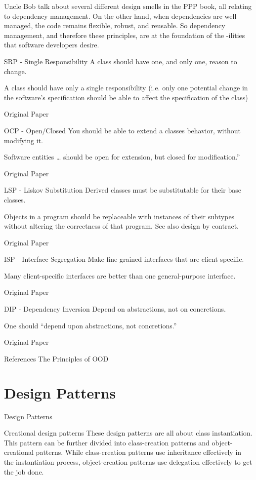 Uncle Bob talk about several different design smells in the PPP book, all relating to dependency management. On the other hand, when dependencies are well managed, the code remains flexible, robust, and reusable. So dependency management, and therefore these principles, are at the foundation of the -ilities that software developers desire.

SRP - Single Responsibility
A class should have one, and only one, reason to change.

A class should have only a single responsibility (i.e. only one potential change in the software's specification should be able to affect the specification of the class)

Original Paper

OCP - Open/Closed
You should be able to extend a classes behavior, without modifying it.

Software entities … should be open for extension, but closed for modification.”

Original Paper

LSP - Liskov Substitution
Derived classes must be substitutable for their base classes.

Objects in a program should be replaceable with instances of their subtypes without altering the correctness of that program. See also design by contract.

Original Paper

ISP - Interface Segregation
Make fine grained interfaces that are client specific.

Many client-specific interfaces are better than one general-purpose interface.

Original Paper

DIP - Dependency Inversion
Depend on abstractions, not on concretions.

One should “depend upon abstractions, not concretions.”

Original Paper

References
The Principles of OOD

\section{Design Patterns}

Design Patterns


Creational design patterns
These design patterns are all about class instantiation. This pattern can be further divided into class-creation patterns and object-creational patterns. While class-creation patterns use inheritance effectively in the instantiation process, object-creation patterns use delegation effectively to get the job done.













